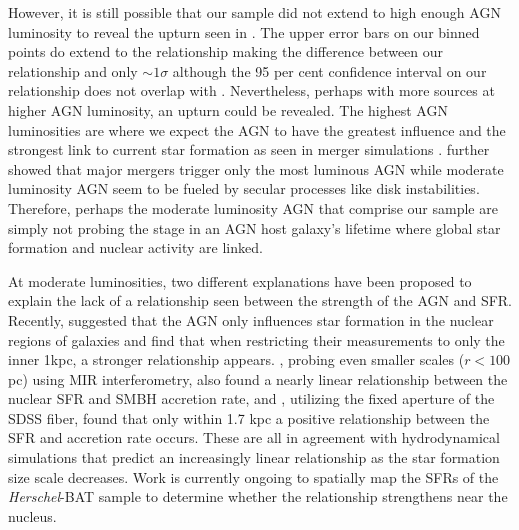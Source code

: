 \documentclass[fleqn, usenatbib]{mnras}
\newcommand{\herschel}{\emph{Herschel}}
\newcommand{\swift}{\textit{Swift}}
\begin{document}

However, it is still possible that our sample did not extend to high enough AGN luminosity to reveal the upturn seen in \citet{Rosario:2012fr}. The upper error bars on our binned points do extend to the \citet{Rosario:2012fr} relationship making the difference between our relationship and \citet{Rosario:2012fr} only $\sim1\sigma$ although the 95 per cent confidence interval on our relationship does not overlap with \citet{Rosario:2012fr}. Nevertheless, perhaps with more sources at higher AGN luminosity, an upturn could be revealed. The highest AGN luminosities are where we expect the AGN to have the greatest influence and the strongest link to current star formation as seen in merger simulations \citep[e.g.][]{Di-Matteo:2005lr}. \citet{Treister:2012rt} further showed that major mergers trigger only the most luminous AGN while moderate luminosity AGN seem to be fueled by secular processes like disk instabilities. Therefore, perhaps the moderate luminosity AGN that comprise our sample are simply not probing the stage in an AGN host galaxy's lifetime where global star formation and nuclear activity are linked. 

At moderate luminosities, two different explanations have been proposed to explain the lack of a relationship seen between the strength of the AGN and SFR. Recently, \citet{Diamond-Stanic:2012rw} suggested that the AGN only influences star formation in the nuclear regions of galaxies and find that when restricting their measurements to only the inner 1kpc, a stronger relationship appears. \citet{Esquej:2014vl}, probing even smaller scales ($r < 100$ pc) using MIR interferometry, also found a nearly linear relationship between the nuclear SFR and SMBH accretion rate, and  \citet{LaMassa:2013hb}, utilizing the fixed aperture of the SDSS fiber, found that only within 1.7 kpc a positive relationship between the SFR and accretion rate occurs. These are all in agreement with hydrodynamical simulations \citep{Hopkins:2010kx, Thacker:2014pd} that predict an increasingly linear relationship as the star formation size scale decreases. Work is currently ongoing to spatially map the SFRs of the \herschel-BAT sample to determine whether the relationship strengthens near the nucleus.
\end{document}
